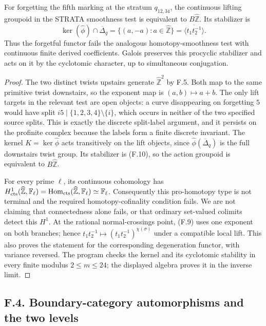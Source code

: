 For forgetting the fifth marking at the stratum $q_{12,34}$, the continuous lifting groupoid in the STRATA smoothness test is equivalent to
$B\widehat{\mathbb Z}$. Its stabilizer is
\[
\ker(\widehat\phi)\cap\overline\Delta_q
  =\{(a,-a):a\in\widehat{\mathbb Z}\}
  =\overline{\langle t_1t_2^{-1}\rangle}.                      \tag{F.10}
\]
Thus the forgetful functor fails the analogous homotopy-smoothness test with continuous finite derived coefficients. Galois preserves this procyclic stabilizer and acts on it by the cyclotomic character, up to simultaneous conjugation.
\begin{proof}
The two distinct twists upstairs generate $\widehat{\mathbb Z}^2$ by F.5. Both map to the same primitive twist downstairs, so the exponent map is $(a,b)\mapsto a+b$. The only lift targets in the relevant test are open objects: a curve disappearing on forgetting $5$ would have split $i5\mid\{1,2,3,4\}\setminus\{i\}$, which occurs in neither of the two specified source splits. This is exactly the discrete split-label argument, and it persists on the profinite complex because the labels form a finite discrete invariant. The kernel $K=\ker\widehat\phi$ acts transitively on the lift objects, since $\widehat\phi(\overline\Delta_q)$ is the full downstairs twist group. Its stabilizer is (F.10), so the action groupoid is equivalent to $B\widehat{\mathbb Z}$.

For every prime $\ell$, its continuous cohomology has
$H^1_{\mathrm{cts}}(\widehat{\mathbb Z},\mathbb F_\ell)
 =\operatorname{Hom}_{\mathrm{cts}}(\widehat{\mathbb Z},\mathbb F_\ell)\simeq\mathbb F_\ell$.
Consequently this pro-homotopy type is not terminal and the required homotopy-cofinality condition fails. We are not claiming that connectedness alone fails, or that ordinary set-valued colimits detect this $H^1$. At the rational normal-crossings point, (F.9) uses one exponent on both branches; hence $t_1t_2^{-1}\mapsto(t_1t_2^{-1})^{\chi(\sigma)}$ under a compatible local lift. This also proves the statement for the corresponding degeneration functor, with variance reversed. The program checks the kernel and its cyclotomic stability in every finite modulus $2\leq m\leq24$; the displayed algebra proves it in the inverse limit.
\end{proof}

\subsection{F.4. Boundary-category automorphisms and the two levels}

